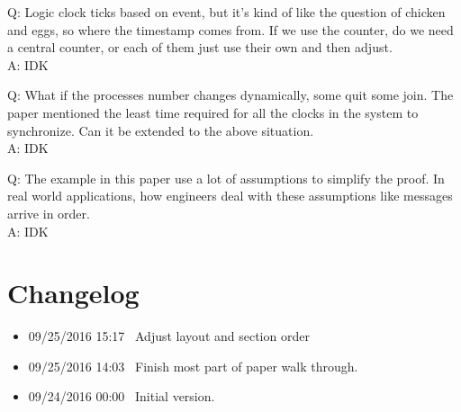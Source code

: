 \documentclass[12pt,a4paper,oneside]{article}
\begin{document}
\medskip

Q: Logic clock ticks based on event, but it's kind of like the question of chicken and eggs, so where the timestamp comes from.
If we use the counter, do we need a central counter, or each of them just use their own and then adjust. \\
A: IDK

\medskip

Q: What if the processes number changes dynamically, some quit some join. The paper mentioned the least time required for all the
clocks in the system to synchronize. Can it be extended to the above situation. \\
A: IDK

\medskip

Q: The example in this paper use a lot of assumptions to simplify the proof.
In real world applications, how engineers deal with these assumptions like messages
arrive in order. \\
A: IDK

\section{Changelog}

\begin{itemize}
  \item 09/25/2016 15:17 \ Adjust layout and section order
  \item 09/25/2016 14:03 \ Finish most part of paper walk through.
  \item 09/24/2016 00:00 \ Initial version.
\end{itemize}

\printbibliography
\end{document}
